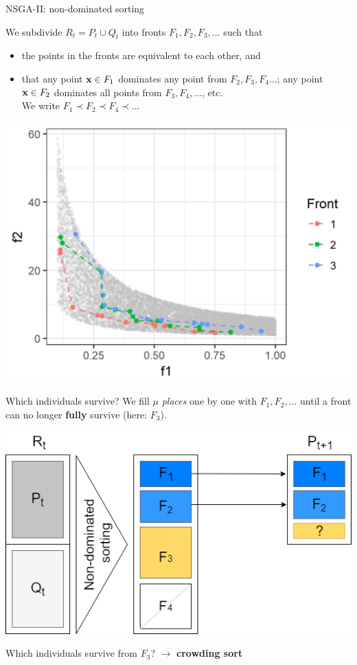 \begin{frame}[allowframebreaks]{NSGA-II: non-dominated sorting}



\begin{footnotesize}
We subdivide $R_t = P_t \cup Q_t$ into fronts $F_1, F_2, F_3, ...$ such that

\begin{itemize}
\item the points in the fronts are equivalent to each other, and
\item that any point $\mathbf{x} \in F_1$ dominates any point from $F_2, F_3, F_4...$; any point $\mathbf{x} \in F_2$ dominates all points from $F_3, F_4, ...$, etc. \\
We write $F_1 \prec F_2 \prec F_4 \prec ... $
\end{itemize}
\end{footnotesize}
    \vspace{-0.5cm}
\begin{center}
\includegraphics[width = 0.4\linewidth]{images/NSGA2_NDS.png}
\end{center}

\framebreak

Which individuals survive? We fill $\mu$ \textit{places} one by one with $F_1, F_2, ...$ until a front can no longer \textbf{fully} survive (here: $F_3$).

\begin{center}
\includegraphics[width = 0.45\linewidth]{images/NSGA2_2.png}
\end{center}

Which individuals survive from $F_3$? $\to$ \textbf{crowding sort}

\end{frame}

